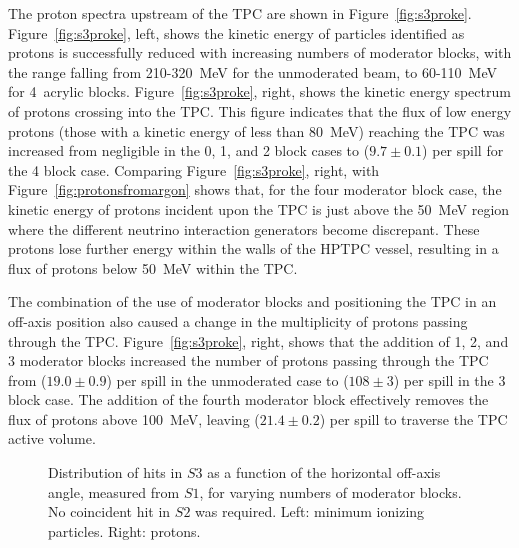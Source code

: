 The proton spectra upstream of the TPC are shown in Figure~\ref{fig:s3proke}.
Figure~\ref{fig:s3proke}, left, shows the kinetic energy of particles identified as protons is successfully reduced with increasing numbers of moderator blocks, with the range falling from 210-320~MeV for the unmoderated beam, to 60-110~MeV for 4~acrylic blocks.
Figure~\ref{fig:s3proke}, right, shows the kinetic energy spectrum of protons crossing into the TPC.
This figure indicates that the flux of low energy protons (those with a kinetic energy of less than 80~MeV) reaching the TPC was increased from negligible in the 0, 1, and 2 block cases to ($9.7 \pm 0.1$) per spill for the 4 block case.
Comparing Figure~\ref{fig:s3proke}, right, with Figure~\ref{fig:protonsfromargon} shows that, for the four moderator block case, the kinetic energy of protons incident upon the TPC is just above the 50~MeV region where the different neutrino interaction generators become discrepant.
These protons lose further energy within the walls of the HPTPC vessel, resulting in a flux of protons below 50~MeV within the TPC.

The combination of the use of moderator blocks and positioning the TPC in an off-axis position also caused a change in the multiplicity of protons passing through the TPC.
Figure~\ref{fig:s3proke}, right, shows that the addition of 1, 2, and 3 moderator blocks increased the number of protons passing through the TPC from ($19.0 \pm 0.9$) per spill in the unmoderated case to ($108 \pm 3$) per spill in the 3 block case.
The addition of the fourth moderator block effectively removes the flux of protons above 100~MeV, leaving ($21.4 \pm 0.2$) per spill to traverse the TPC active volume.
  
\begin{figure}[h]
  \begin{minipage}{0.48\textwidth}
    \begin{adjustbox}{max totalsize={\textwidth}{.35\textheight},center}
      
    \end{adjustbox}
  \end{minipage}
  \hspace{0.3cm}
  \begin{minipage}{0.48\textwidth}
    \begin{adjustbox}{max totalsize={\textwidth}{.35\textheight},center}
      
    \end{adjustbox}
  \end{minipage}
    \caption{\label{fig:s1s3mips}Distribution of hits in $\mathit{S3}$ as a function of the horizontal off-axis angle, measured from $\mathit{S1}$, for varying numbers of moderator blocks. No coincident hit in $\mathit{S2}$ was required. Left: minimum ionizing particles. Right: protons.}
\end{figure}

